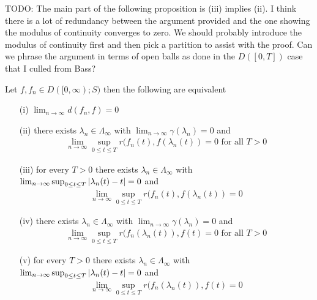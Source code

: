 TODO: The main part of the following proposition is (iii) implies (ii).  I think there is a lot of redundancy between the argument provided and the one showing the modulus of continuity converges to zero.  We should probably introduce the modulus of continuity first and then pick a partition to assist with the proof.  Can we phrase the argument in terms
of open balls as done in the $D([0,T])$ case that I culled from Bass?

\begin{prop}\label{SkorohodInfiniteJ1EquivalenceB}Let $f,f_n \in D([0,\infty); S)$ then the following are equivalent
\begin{itemize}
\item[(i)] $\lim_{n \to \infty} d(f_n,f) = 0$ 
\item[(ii)] there exists $\lambda_n \in \Lambda_\infty$ with $\lim_{n \to \infty} \gamma(\lambda_n) = 0$ and 
\begin{align*}
\lim_{n \to \infty} \sup_{0 \leq t \leq T} r(f_n(t), f(\lambda_n(t)) = 0 \text{ for all $T > 0$}
\end{align*}
\item[(iii)] for every $T > 0$ there exists $\lambda_n \in \Lambda_\infty$ with $\lim_{n \to \infty} \sup_{0 \leq t \leq T} \left \vert \lambda_n(t) -t \right \vert = 0$ and 
\begin{align*}
\lim_{n \to \infty} \sup_{0 \leq t \leq T} r(f_n(t), f(\lambda_n(t)) = 0
\end{align*}
\item[(iv)] there exists $\lambda_n \in \Lambda_\infty$ with $\lim_{n \to \infty} \gamma(\lambda_n) = 0$ and 
\begin{align*}
\lim_{n \to \infty} \sup_{0 \leq t \leq T} r(f_n(\lambda_n(t)), f(t) = 0 \text{ for all $T > 0$}
\end{align*}
\item[(v)] for every $T > 0$ there exists $\lambda_n \in \Lambda_\infty$ with $\lim_{n \to \infty} \sup_{0 \leq t \leq T} \left \vert \lambda_n(t) -t \right \vert = 0$ and 
\begin{align*}
\lim_{n \to \infty} \sup_{0 \leq t \leq T} r(f_n(\lambda_n(t)), f(t) = 0
\end{align*}
\end{itemize}
\end{prop}
